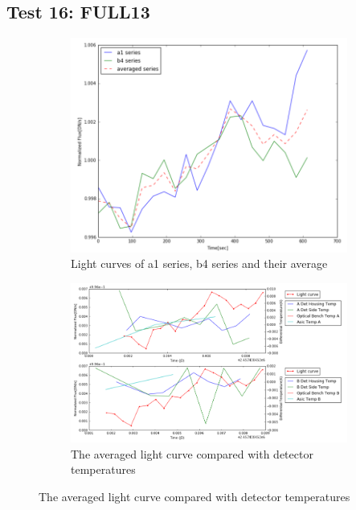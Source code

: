 \documentclass{aastex6}
\begin{document}
\subsection{Test 16: FULL13} 
\begin{figure}[H]
    \centering
    \begin{subfigure}{1}
        \includegraphics[scale=0.4]{ts_test16}
        \caption{Light curves of a1 series, b4 series and their average}
    \end{subfigure}

    \begin{subfigure}{2}
        \includegraphics[scale=0.4]{temp_test16}
        \caption{The averaged light curve compared with detector temperatures}
    \end{subfigure}
   

\end{figure}
\end{document}
